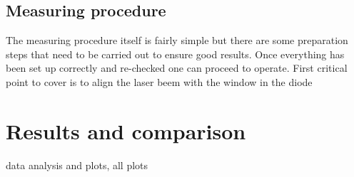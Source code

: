 \subsection{Measuring procedure} 

The measuring procedure itself is fairly simple but there are some preparation steps that need to be carried out to ensure good results. Once everything has been set up correctly and re-checked one can proceed to operate. First critical point to cover is to align the laser beem with the window in the diode









\section{Results and comparison} %
\label{sec:future_projection}

data analysis and plots, all plots 


